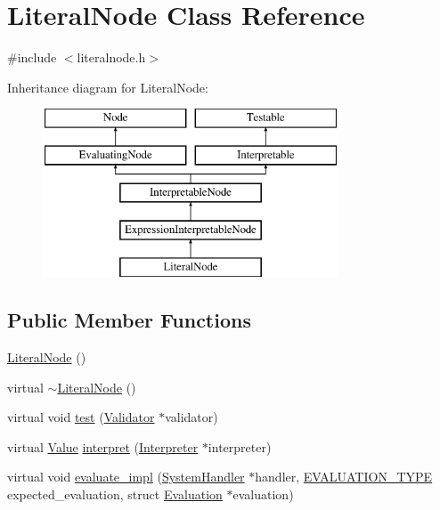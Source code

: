 \hypertarget{classLiteralNode}{}\section{Literal\+Node Class Reference}
\label{classLiteralNode}


{\ttfamily \#include $<$literalnode.\+h$>$}

Inheritance diagram for Literal\+Node\+:\begin{figure}[H]
\begin{center}
\leavevmode
\includegraphics[height=5.000000cm]{classLiteralNode}
\end{center}
\end{figure}
\subsection*{Public Member Functions}
\begin{DoxyCompactItemize}
\item 
\hyperlink{classLiteralNode_ae50674f947b26ee018592984c6c6117b}{Literal\+Node} ()
\item 
virtual \hyperlink{classLiteralNode_a09793ae51506882eaa8d345eeef90d16}{$\sim$\+Literal\+Node} ()
\item 
virtual void \hyperlink{classLiteralNode_af55e4e5e668c9be666c0b6c24c3918f9}{test} (\hyperlink{classValidator}{Validator} $\ast$validator)
\item 
virtual \hyperlink{classValue}{Value} \hyperlink{classLiteralNode_abb32ed943c6a5b2029a496ac04885b2a}{interpret} (\hyperlink{classInterpreter}{Interpreter} $\ast$interpreter)
\item 
virtual void \hyperlink{classLiteralNode_ac468128f093b3955ddd7c85eaa959ec2}{evaluate\+\_\+impl} (\hyperlink{classSystemHandler}{System\+Handler} $\ast$handler, \hyperlink{statics_8h_a6664c451ca7787483a7981cc1de68dbb}{E\+V\+A\+L\+U\+A\+T\+I\+O\+N\+\_\+\+T\+Y\+PE} expected\+\_\+evaluation, struct \hyperlink{structEvaluation}{Evaluation} $\ast$evaluation)
\end{DoxyCompactItemize}
